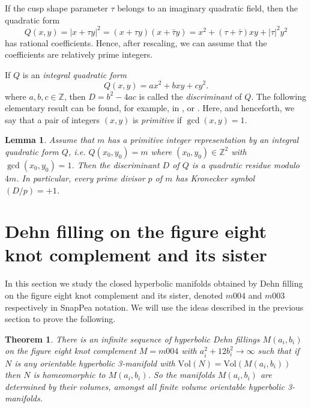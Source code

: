 \documentclass[reqno]{amsproc}  %
\newtheorem{thm}[prop]{\bf Theorem}
\newtheorem{lem}[prop]{\bf Lemma}
\def\Z{\mathbb{Z}}
\def\vol{\text{Vol} }
\begin{document}
\bigskip
If the cusp shape parameter $\tau$ belongs to an 
imaginary quadratic field, then the quadratic form 
$$Q(x,y) = |x+\tau y|^2= (x + \tau y)(x + \bar\tau y) = x^2 + (\tau+\bar\tau) xy + |\tau|^2 y^2$$
has rational coefficients. Hence, after rescaling, we can assume that
the coefficients are relatively prime integers.

If $Q$ is an {\em integral quadratic form} 
\begin{equation}  \label{eq9}
Q(x,y)= a x^2 + b xy + c y^2.
 \end{equation}
where $a,b,c \in \Z$, then $D = b^2 - 4ac$ is called
the {\em discriminant} of $Q$. 
The following elementary result can be found, for example, in 
\cite[Theorem 201, p180]{landau}, \cite[pp25--26]{cox} or \cite[pp49--50]{buell}.
Here, and henceforth,  we say that a pair of integers $(x,y)$ is {\em primitive} if $\gcd(x,y)=1$.
 
\begin{lem} \label{discr_quad_res} 
Assume that $m$ has a {primitive} integer representation by 
an integral  quadratic form $Q$, i.e.
$Q(x_0,y_0)=m$ where $(x_0,y_0) \in \Z^2$ with $\gcd(x_0,y_0)=1$.
Then the discriminant $D$ of $Q$ is a quadratic residue modulo $4m$.
In particular, every prime divisor $p$ of $m$ has Kronecker symbol $(D/p)=+1$.
\end{lem}

\section{Dehn filling on the figure eight knot complement and its sister}

In this section we study the closed hyperbolic manifolds obtained by  Dehn filling on the figure eight knot complement and its sister,  denoted $m004$ and $m003$ respectively in SnapPea notation. We will use the ideas described in the previous section to prove the following.

\begin{thm} \label{closed_unique}
 There is an infinite sequence of hyperbolic Dehn fillings $M(a_i,b_i)$
on the figure eight knot complement $M=m004$ with $a_i^2+12b_i^2 \to  \infty$
such that if $N$ is any orientable hyperbolic 3-manifold with 
$\vol(N)=\vol(M(a_i,b_i))$ then $N$ is homeomorphic to $M(a_i,b_i)$.
So the manifolds $M(a_i,b_i)$ are determined by their volumes, amongst all 
finite volume orientable hyperbolic 3-manifolds.
\end{thm}
\end{document}
